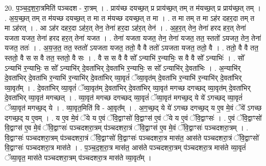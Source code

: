 \documentclass[17pt]{extarticle}
\begin{document}
20. प॒ञ्च॒द॒श॒रा॒त्रमिति॑ पञ्चदश - रा॒त्रम् । . प्राय॑च्छ दयच्छ॒त् प्र प्राय॑च्छ॒त् तम् त म॑यच्छ॒त् प्र प्राय॑च्छ॒त् तम् । . अ॒य॒च्छ॒त् तम् त म॑यच्छ दयच्छ॒त् त मा त म॑यच्छ दयच्छ॒त् त मा । . त मा तम् त मा ऽह॑र दहर॒दा तम् त मा ऽह॑रत् । . आ ऽह॑र दहर॒दा ऽह॑र॒त् तेन॒ तेना॑ हर॒दा ऽह॑र॒त् तेन॑ । . अ॒ह॒र॒त् तेन॒ तेना॑ हरद हर॒त् तेना॑ यजता यजत॒ तेना॑ हरद हर॒त् तेना॑ यजत । . तेना॑ यजता यजत॒ तेन॒ तेना॑ यजत॒ तत॒ स्ततो॑ ऽयजत॒ तेन॒ तेना॑ यजत॒ ततः॑ । . अ॒य॒ज॒त॒ तत॒ स्ततो॑ ऽयजता यजत॒ ततो॒ वै वै ततो॑ ऽयजता यजत॒ ततो॒ वै । . ततो॒ वै वै तत॒ स्ततो॒ वै स स वै तत॒ स्ततो॒ वै सः । . वै स स वै वै सो᳚ ऽन्याभि॑ र॒न्याभिः॒ स वै वै सो᳚ ऽन्याभिः॑ । . सो᳚ ऽन्याभि॑ र॒न्याभिः॒ स सो᳚ ऽन्याभि॑र् दे॒वता॑भिर् दे॒वता॑भि र॒न्याभिः॒ स सो᳚ ऽन्याभि॑र् दे॒वता॑भिः । . अ॒न्याभि॑र् दे॒वता॑भिर् दे॒वता॑भि र॒न्याभि॑ र॒न्याभि॑र् दे॒वता॑भिर् व्या॒वृतं॑ ॅव्या॒वृत॑म् दे॒वता॑भि र॒न्याभि॑ र॒न्याभि॑र् दे॒वता॑भिर् व्या॒वृत᳚म् । . दे॒वता॑भिर् व्या॒वृतं॑ ॅव्या॒वृत॑म् दे॒वता॑भिर् दे॒वता॑भिर् व्या॒वृत॑ मगच्छ दगच्छद् व्या॒वृत॑म् दे॒वता॑भिर् दे॒वता॑भिर् व्या॒वृत॑ मगच्छत् । . व्या॒वृत॑ मगच्छ दगच्छद् व्या॒वृतं॑ ॅव्या॒वृत॑ मगच्छ॒द् ये ये॑ ऽगच्छद् व्या॒वृतं॑ ॅव्या॒वृत॑ मगच्छ॒द् ये । . व्या॒वृत॒मिति॑ वि - आ॒वृत᳚म् । . अ॒ग॒च्छ॒द् ये ये॑ ऽगच्छ दगच्छ॒द् य ए॒व मे॒वं ॅये॑ ऽगच्छ दगच्छ॒द् य ए॒वम् । . य ए॒व मे॒वं ॅये य ए॒वं ॅवि॒द्वाꣳसो॑ वि॒द्वाꣳस॑ ए॒वं ॅये य ए॒वं ॅवि॒द्वाꣳसः॑ । . ए॒वं ॅवि॒द्वाꣳसो॑ वि॒द्वाꣳस॑ ए॒व मे॒वं ॅवि॒द्वाꣳसः॑ पञ्चदशरा॒त्रम् प॑ञ्चदशरा॒त्रं ॅवि॒द्वाꣳस॑ ए॒व मे॒वं ॅवि॒द्वाꣳसः॑ पञ्चदशरा॒त्रम् । . वि॒द्वाꣳसः॑ पञ्चदशरा॒त्रम् प॑ञ्चदशरा॒त्रं ॅवि॒द्वाꣳसो॑ वि॒द्वाꣳसः॑ पञ्चदशरा॒त्र मास॑त॒ आस॑ते पञ्चदशरा॒त्रं ॅवि॒द्वाꣳसो॑ वि॒द्वाꣳसः॑ पञ्चदशरा॒त्र मास॑ते । . प॒ञ्च॒द॒श॒रा॒त्र मास॑त॒ आस॑ते पञ्चदशरा॒त्रम् प॑ञ्चदशरा॒त्र मास॑ते व्या॒वृतं॑ ॅव्या॒वृत॒ मास॑ते पञ्चदशरा॒त्रम् प॑ञ्चदशरा॒त्र मास॑ते व्या॒वृत᳚म् । \newline
\end{document}
